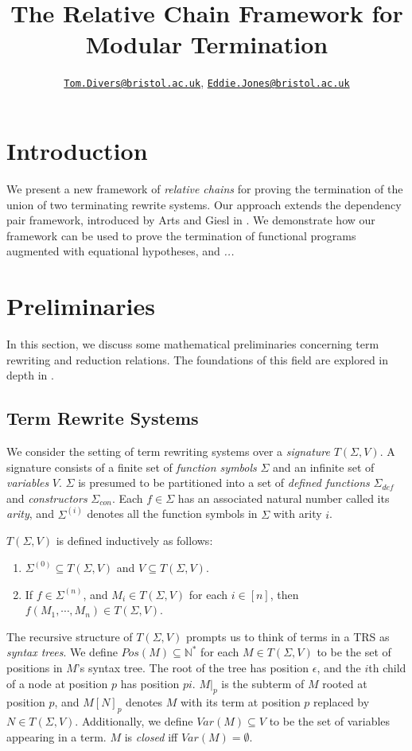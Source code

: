 \documentclass{article}
\title{The Relative Chain Framework for Modular Termination}
\author{\href{mailto:oi24939@bristol.ac.uk}{\texttt{Tom.Divers@bristol.ac.uk}}, \href{mailto:eddie.jones@bristol.ac.uk}{\texttt{Eddie.Jones@bristol.ac.uk}}}
\date{}
\begin{document}
\maketitle

\section{Introduction}

We present a new framework of \emph{relative chains} for proving the termination of the union of two terminating rewrite systems. Our approach extends the dependency pair framework, introduced by Arts and Giesl in \cite{arts2000dependency}. We demonstrate how our framework can be used to prove the termination of functional programs augmented with equational hypotheses, and \emph{...}

\section{Preliminaries}

In this section, we discuss some mathematical preliminaries concerning term rewriting and reduction relations. The foundations of this field are explored in depth in \cite{baader1998terms}.

\subsection{Term Rewrite Systems}

We consider the setting of term rewriting systems over a \emph{signature} $T(\Sigma, V)$. A signature consists of a finite set of \emph{function symbols} $\Sigma$ and an infinite set of \emph{variables} $V$. $\Sigma$ is presumed to be partitioned into a set of \emph{defined functions} $\Sigma_{def}$ and \emph{constructors} $\Sigma_{con}$. Each $f \in \Sigma$ has an associated natural number called its \emph{arity}, and $\Sigma^{(i)}$ denotes all the function symbols in $\Sigma$ with arity $i$.

$T(\Sigma, V)$ is defined inductively as follows: \begin{enumerate}
    \item $\Sigma^{(0)} \subseteq T(\Sigma, V)$ and $V \subseteq T(\Sigma, V)$. 
    \item If $f \in \Sigma^{(n)}$, and $M_i \in T(\Sigma, V)$ for each $i \in [n]$, then $f(M_1, \cdots, M_n) \in T(\Sigma, V)$. 
\end{enumerate}

The recursive structure of $T(\Sigma, V)$ prompts us to think of terms in a TRS as \emph{syntax trees}. We define $Pos(M) \subseteq \mathbb{N}^*$ for each $M \in T(\Sigma, V)$ to be the set of positions in $M$'s syntax tree. The root of the tree has position $\epsilon$, and the $i$th child of a node at position $p$ has position $pi$. $M|_p$ is the subterm of $M$ rooted at position $p$, and $M[N]_p$ denotes $M$ with its term at position $p$ replaced by $N \in T(\Sigma, V)$. Additionally, we define $Var(M) \subseteq V$ to be the set of variables appearing in a term. $M$ is \emph{closed} iff $Var(M) = \emptyset$. 
\end{document}
